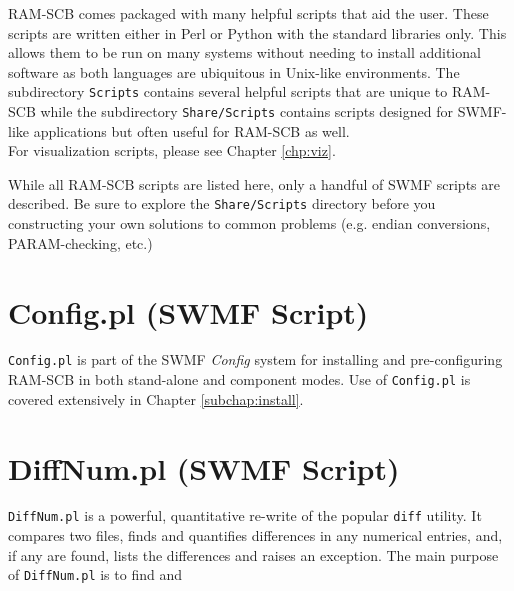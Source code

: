 RAM-SCB comes packaged with many helpful scripts that aid the user.  These scripts are written either in Perl or Python with the standard libraries only. This allows them to be run on many systems without needing to install additional software as both languages are ubiquitous in Unix-like environments. The subdirectory {\tt Scripts} contains several helpful scripts that are unique to RAM-SCB while the subdirectory {\tt Share/Scripts} contains scripts designed for SWMF-like applications but often useful for RAM-SCB as well.
\\
For visualization scripts, please see Chapter \ref{chp:viz}.

% 

While all RAM-SCB scripts are listed here, only a handful of SWMF scripts are described. Be sure to explore the {\tt Share/Scripts} directory before you constructing your own solutions to common problems (e.g. endian conversions, PARAM-checking, etc.) 

\section{Config.pl (SWMF Script)}
{\tt Config.pl} is part of the SWMF \textit{Config} system for installing and pre-configuring RAM-SCB in both stand-alone and component modes. Use of {\tt Config.pl} is covered extensively in Chapter \ref{subchap:install}.

\section{DiffNum.pl (SWMF Script)}
{\tt DiffNum.pl} is a powerful, quantitative re-write of the popular {\tt diff} utility.  It compares two files, finds and quantifies differences in any numerical entries, and, if any are found, lists the differences and raises an exception.  The main purpose of {\tt DiffNum.pl} is to find and %

